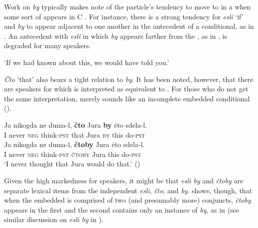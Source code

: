 \documentclass[output=paper,modfonts,newtxmath,hidelinks,]{langscibook}
\begin{document}
Work on \textit{by} typically makes note of the particle’s tendency to move to  in a  when some sort of  appears in C \citep[29]{Hacking1998}. For instance, there is a strong tendency for \textit{esli} ‘if’ and \textit{by} to appear adjacent to one another in the antecedent of a conditional, as in . An antecedent with \textit{esli} in which \textit{by} appears farther from the , as in , is degraded for many speakers. 

\ea 
{}
\z 
\glt `If we had known about this, we would have told you.'\hfill \citep[29]{Hacking1998}
\z

\noindent \textit{Čto} ‘that’ also bears a tight relation to \textit{by}. It has been noted, however, that there are speakers for which  is interpreted as equivalent to . For those who do not get the same interpretation,  merely sounds like an incomplete embedded conditional (\citealt[40]{Brecht1977}).

\ea \ea\label{10:ex26}
\gll Ja nikogda ne duma-l, \textbf{čto} Jura \textbf{by} \.eto sdela-l.\\
     I never \textsc{neg} think\textsc{-pst} that Jura \textsc{by} this do\textsc{-pst}\\
     \ex \label{10:ex27}
\gll Ja nikogda ne duma-l, \textbf{čtoby} Jura \.eto sdela-l.\\
     I never \textsc{neg} think\textsc{-pst} \textsc{čtoby} Jura this do\textsc{-pst}\\
\z
\glt `I never thought that Jura would do that.' \hfill (\citealt[40, fn. 10]{Brecht1977})
\z


\noindent Given the high markedness for speakers, it might be that \textit{esli by} and \textit{čtoby} are separate lexical items from the independent \textit{esli}, \textit{čto}, and \textit{by}. \citet{Brecht1977} shows, though, that when the embedded  is comprised of two (and presumably more) conjuncts, \textit{čtoby} appears in the first  and the second  contains only an instance of \textit{by}, as in  (see similar discussion on \textit{esli by} in \citealt[29-32]{Hacking1998}).
\end{document}
